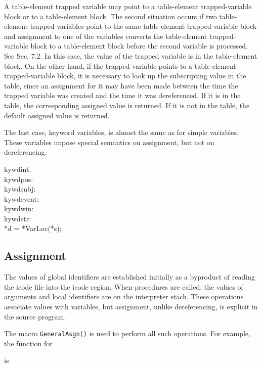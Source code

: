A table-element trapped variable may point to a table-element
trapped-variable block or to a table-element block. The second
situation occurs if two table-element trapped variables point to the
same table-element trapped-variable block and assignment to one of the
variables converts the table-element trapped-variable block to a
table-element block before the second variable is processed. See
Sec. 7.2. In this case, the value of the trapped variable is in the
table-element block. On the other hand, if the trapped variable points
to a table-element trapped-variable block, it is necessary to look up
the subscripting value in the table, since an assignment for it may
have been made between the time the trapped variable was created and
the time it was dereferenced. If it is in the table, the corresponding
assigned value is returned. If it is not in the table, the default
assigned value is returned.

The last case, keyword variables, is almost the same as for
simple variables. These variables impose special semantics on
assignment, but not on dereferencing.

\begin{iconcode}
\>\>kywdint:\\
\>\>kywdpos:\\
\>\>kywdsubj:\\
\>\>kywdevent:\\
\>\>kywdwin:\\
\>\>kywdstr:\\
\>\>\>*d = *VarLoc(*s);
\end{iconcode}

\subsection{Assignment}

The values of global identifiers are established initially as a
byproduct of reading the icode file into the icode region. When
procedures are called, the values of arguments and local identifiers
are on the interpreter stack. These operations associate values with
variables, but assignment, unlike dereferencing, is explicit in the
source program.


The macro \texttt{GeneralAsgn()} is used to perform all such
operations. For example, the function for


is

